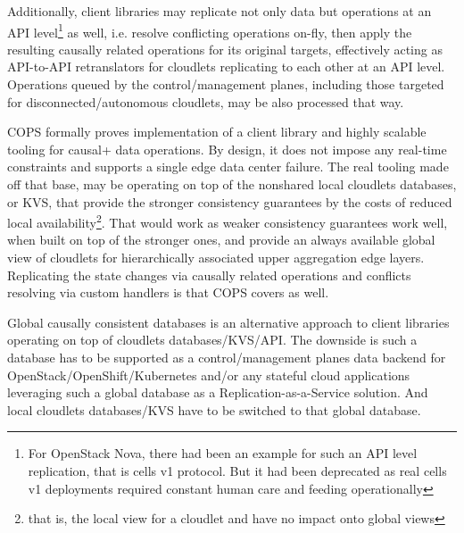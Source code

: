 \documentclass[conference]{IEEEtran}
\begin{document}
Additionally, client libraries may replicate not only data but operations at an
API level\footnote{For OpenStack Nova, there had been an example for such an
API level replication, that is cells v1 protocol. But it had been deprecated as
real cells v1 deployments required constant human care and feeding
operationally} as well, i.e. resolve conflicting operations on-fly, then apply
the resulting causally related operations for its original targets, effectively
acting as API-to-API retranslators for cloudlets replicating to each other at
an API level. Operations queued by the control/management planes, including
those targeted for disconnected/autonomous cloudlets, may be also processed
that way.

COPS formally proves implementation of a client library and highly scalable
tooling for causal+ data operations. By design, it does not impose any
real-time constraints and supports a single edge data center failure. The real
tooling made off that base, may be operating on top of the nonshared local
cloudlets databases, or KVS, that provide the stronger consistency guarantees
by the costs of reduced local availability\footnote{that is, the local view for
a cloudlet and have no impact onto global views}. That would work as weaker
consistency guarantees work well, when built on top of the stronger ones, and
provide an always available global view of cloudlets for hierarchically
associated upper aggregation edge layers. Replicating the state changes via
causally related operations and conflicts resolving via custom handlers is that
COPS covers as well.

Global causally consistent databases\cite{b6} is an alternative approach to
client libraries operating on top of cloudlets databases/KVS/API. The downside
is such a database has to be supported as a control/management planes data
backend for OpenStack/OpenShift/Kubernetes and/or any stateful cloud
applications leveraging such a global database as a Replication-as-a-Service
solution. And local cloudlets databases/KVS have to be switched to that global
database.
\end{document}
